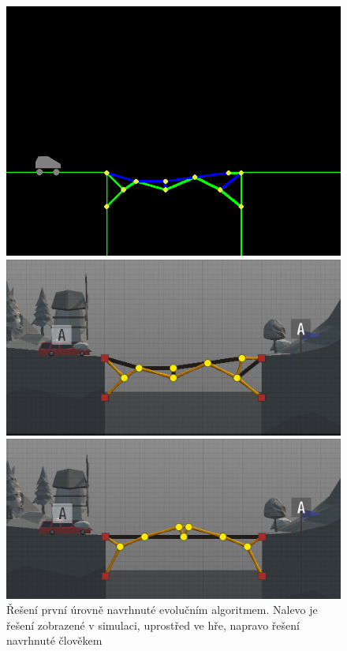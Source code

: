 \begin{figure}[ht]
    \centering
    \begin{minipage}{0.32\textwidth}
        \centering
        \includegraphics[width=\linewidth]{img/lvl1-sim-ea}
    \end{minipage}\hfill
    \begin{minipage}{0.32\textwidth}
        \centering
        \includegraphics[width=\linewidth]{img/lvl1-poly-ea}
    \end{minipage}
    \begin{minipage}{0.32\textwidth}
        \centering
        \includegraphics[width=\linewidth]{img/lvl1-poly-human}
    \end{minipage}
    \caption{Řešení první úrovně navrhnuté evolučním algoritmem. Nalevo je řešení zobrazené v simulaci, uprostřed ve hře, napravo řešení navrhnuté člověkem}
    \label{exp:lvl1}
\end{figure}

